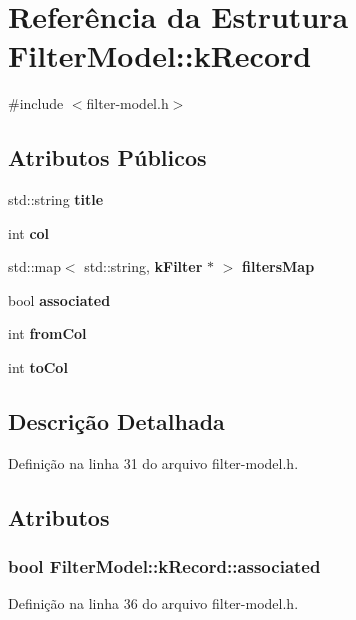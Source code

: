 \section{Referência da Estrutura Filter\+Model\+:\+:k\+Record}
\label{struct_filter_model_1_1k_record}


{\ttfamily \#include $<$filter-\/model.\+h$>$}

\subsection*{Atributos Públicos}
\begin{DoxyCompactItemize}
\item 
std\+::string {\bf title}
\item 
int {\bf col}
\item 
std\+::map$<$ std\+::string, {\bf k\+Filter} $\ast$ $>$ {\bf filters\+Map}
\item 
bool {\bf associated}
\item 
int {\bf from\+Col}
\item 
int {\bf to\+Col}
\end{DoxyCompactItemize}


\subsection{Descrição Detalhada}


Definição na linha 31 do arquivo filter-\/model.\+h.



\subsection{Atributos}
\subsubsection[{associated}]{\setlength{\rightskip}{0pt plus 5cm}bool Filter\+Model\+::k\+Record\+::associated}\label{struct_filter_model_1_1k_record_adc569869618479463de527bbae9f70ac}


Definição na linha 36 do arquivo filter-\/model.\+h.

